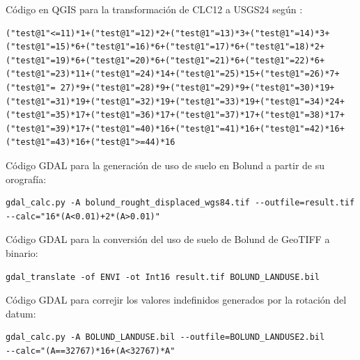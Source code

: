 Código en QGIS para la transformación de CLC12 a USGS24 según \cite{Pineda2004}:
\lstset{style=consola}
\begin{lstlisting}
("test@1"<=11)*1+("test@1"=12)*2+("test@1"=13)*3+("test@1"=14)*3+
("test@1"=15)*6+("test@1"=16)*6+("test@1"=17)*6+("test@1"=18)*2+
("test@1"=19)*6+("test@1"=20)*6+("test@1"=21)*6+("test@1"=22)*6+
("test@1"=23)*11+("test@1"=24)*14+("test@1"=25)*15+("test@1"=26)*7+
("test@1"= 27)*9+("test@1"=28)*9+("test@1"=29)*9+("test@1"=30)*19+
("test@1"=31)*19+("test@1"=32)*19+("test@1"=33)*19+("test@1"=34)*24+
("test@1"=35)*17+("test@1"=36)*17+("test@1"=37)*17+("test@1"=38)*17+
("test@1"=39)*17+("test@1"=40)*16+("test@1"=41)*16+("test@1"=42)*16+
("test@1"=43)*16+("test@1">=44)*16
\end{lstlisting}
Código GDAL para la generación de uso de suelo en Bolund a partir de su orografía:
\begin{lstlisting}
gdal_calc.py -A bolund_rought_displaced_wgs84.tif --outfile=result.tif 
--calc="16*(A<0.01)+2*(A>0.01)"
\end{lstlisting}
Código GDAL para la conversión del uso de suelo de Bolund de GeoTIFF a binario:
\begin{lstlisting}
gdal_translate -of ENVI -ot Int16 result.tif BOLUND_LANDUSE.bil
\end{lstlisting}
Código GDAL para correjir los valores indefinidos generados por la rotación del datum:
\begin{lstlisting}
gdal_calc.py -A BOLUND_LANDUSE.bil --outfile=BOLUND_LANDUSE2.bil 
--calc="(A==32767)*16+(A<32767)*A"
\end{lstlisting}

